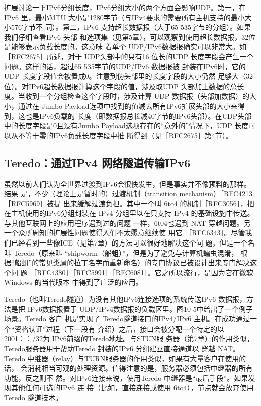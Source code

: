 扩展讨论一下IPv6分组长度，IPv6分组大小的两个方面会影响UDP。第一，在IPv6
里，最小MTU 大小是1280字节（与IPv4要求的需要所有主机支持的最小大小576字节不
同）。第二，IPv6 支持超长数据报（大于65 535字节的分组）。如果我们仔细查看IPv6 头部
和选项集（见第5章），可以观察到使用超长数据报，32位是能够表示负载长度的。这意味
着单个 UDP/IPv6数据报确实可以非常大。如［RFC2675］所述，对于 UDP头部中的只有16
位长的UDP 长度字段会产生一个问题。这样的话，超过65 535字节的UDP/IPv6 数据报被
封装在IPv6时，它的UDP 长度字段值会被置成0。注意到伪头部里的长度字段的大小仍然
足够大（32位）。对IPv6超长数据报计算这个字段的值，涉及取UDP 头部加上数据的总长
度。当收到一个分组检查这个字段时，涉及计算 UDP 数据报（头部加数据）的大小，通过在
Jumbo Payload选项中找到的值减去所有IPv6扩展头部的大小来得到，这也是IPv6负载的
长度（即数据报总长减40字节的IPv6头部）。在UDP头部中的长度字段是0且没有Jumbo
Payload选项存在的“意外的”情况下，UDP 长度可以从不等于零的IPv6负载长度字段中推
断得到（见［RFC2675］第4节）。

\subsection{Teredo：通过IPv4 网络隧道传输IPv6}
虽然以前人们认为全世界过渡到IPv6会很快发生，但是事实并不像预料的那样。结果
是，不少（理论上是暂时的）过渡机制（transition mechanism）［RFC4213］［RFC5969］被提
出来缓解过渡负担。其中一个叫 6to4 的机制［RFC3056］，把在主机使用的IPv6分组封装在
IPv4 分组里以在只支持 IPv4 的基础设施中传送。与其他互联网上的应用程序遇到过的问题
一样，6t04也遇到 NAT 穿越问题。另一个众所周知的扩展性问题使得人们不太愿意继续使
用它 ［RFC6343］。尽管我们已经看到一些像ICE（见第7章）的方法可以很好地解决这个问
题，但是一个名叫 Teredo（原来叫 “shipworm（船蛆）”，但是为了避免与计算机蠕虫混淆，
根据“船蛆”的常见类属的拉丁名字而重新命名）的专门协议已被设计出来专门解决这个问
题 ［RFC4380］［RFC5991］［RFC6081］。它之所以流行，是因为它在微软 Windows 的当代版本
中得到了广泛的应用。

Teredo（也叫Teredo隧道）为没有其他IPv6连接选项的系统传送IPv6 数据报，方法是把
IPv6数据报置于 UDP/IPv4数据报的负载区里。图10-5中给出了一个例子场景。Teredo 客户
机是实现了 Teredo隧道接口的IPv4/IPv6 主机。在成功通过一个“资格认证”过程（下一段有
介绍）之后，接口会被分配一个特定的以2001：：/32为 IPv6前缀的Teredo地址。与STUN服
务器（第7章）的作用类似，Teredo服务器用于帮助Teredo 封装的IPv6 分组建立直接通道以
穿越 NAT。Teredo 中继器（relay）与TURN服务器的作用类似，如果有大量客户在使用的话，
会消耗相当可观的处理资源。值得注意的是，服务器必须包括中继器的所有功能，反之则不
然。对IPv6连接来说，使用Teredo 中继器是“最后手段”。如果发现其他任何可选的IPv6 连
接（比如，直接连接或使用 6to4），节点就会放弃使用 Teredo 隧道技术。

